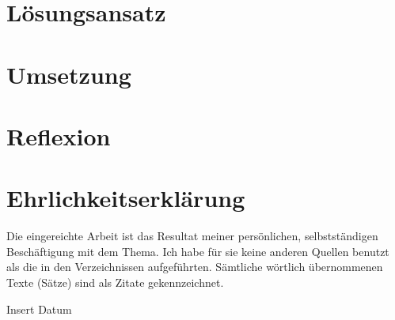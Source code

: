 \documentclass[12pt,a4paper]{report}
\begin{document}
\chapter{Lösungsansatz}
\label{ch:lösungsansatz}

\chapter{Umsetzung}
\label{ch:umsetzung}

\chapter{Reflexion}
\label{ch:reflexion}

%
%
%
{}

\listoffigures

\appendix

\chapter*{Ehrlichkeitserklärung}

Die eingereichte Arbeit ist das Resultat meiner persönlichen, selbstständigen Beschäftigung mit dem Thema.
Ich habe für sie keine anderen Quellen benutzt als die in den Verzeichnissen aufgeführten.
Sämtliche wörtlich übernommenen Texte (Sätze) sind als Zitate gekennzeichnet.

\vspace{2cm}
Insert Datum
\end{document}
